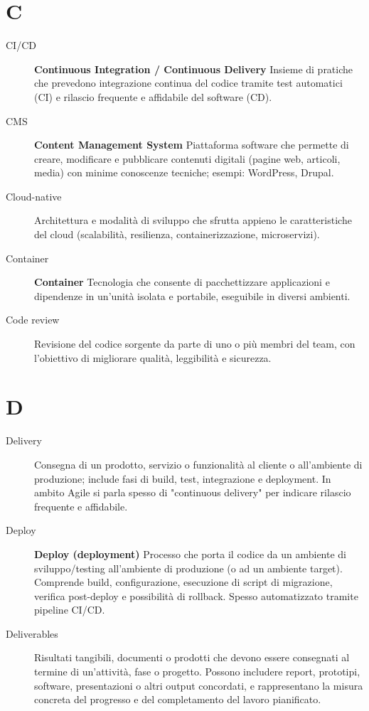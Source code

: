 \section*{C}
\begin{description}
    \item[CI/CD] \textbf{Continuous Integration / Continuous Delivery} Insieme di pratiche che prevedono integrazione continua del codice tramite test automatici (CI) e rilascio frequente e affidabile del software (CD).
    \item[CMS] \textbf{Content Management System} Piattaforma software che permette di creare, modificare e pubblicare contenuti digitali (pagine web, articoli, media) con minime conoscenze tecniche; esempi: WordPress, Drupal.
    \item[Cloud-native] Architettura e modalità di sviluppo che sfrutta appieno le caratteristiche del cloud (scalabilità, resilienza, containerizzazione, microservizi).
    \item[Container] \textbf{Container} Tecnologia che consente di pacchettizzare applicazioni e dipendenze in un'unità isolata e portabile, eseguibile in diversi ambienti.
    \item[Code review] Revisione del codice sorgente da parte di uno o più membri del team, con l’obiettivo di migliorare qualità, leggibilità e sicurezza.
\end{description}

\section*{D}
\begin{description}
    \item[Delivery] Consegna di un prodotto, servizio o funzionalità al cliente o all'ambiente di produzione; include fasi di build, test, integrazione e deployment. In ambito Agile si parla spesso di "continuous delivery" per indicare rilascio frequente e affidabile.
    \item[Deploy] \textbf{Deploy (deployment)} Processo che porta il codice da un ambiente di sviluppo/testing all'ambiente di produzione (o ad un ambiente target). Comprende build, configurazione, esecuzione di script di migrazione, verifica post-deploy e possibilità di rollback. Spesso automatizzato tramite pipeline CI/CD.
    \item[Deliverables] Risultati tangibili, documenti o prodotti che devono essere consegnati al termine di un’attività, fase o progetto. Possono includere report, prototipi, software, presentazioni o altri output concordati, e rappresentano la misura concreta del progresso e del completamento del lavoro pianificato.
\end{description}

